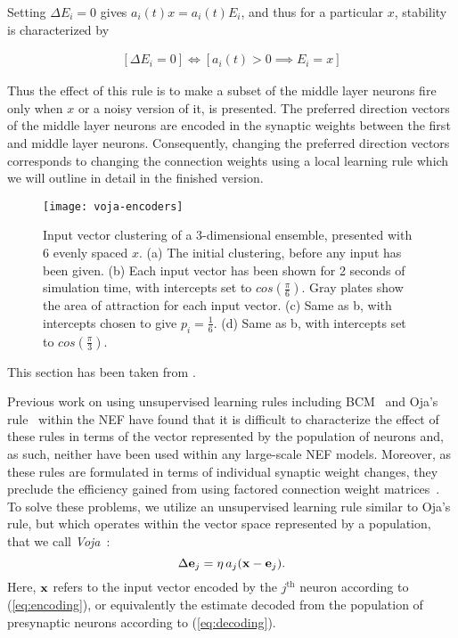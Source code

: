Setting $\Delta{E_i} = 0$ gives $a_i(t)x = a_i(t)E_i$, and thus for a particular $x$, stability is characterized by

\begin{align} \label{stability}
    [\Delta{E_i} = 0]  \iff  [a_i(t) > 0  \implies  E_i = x]
\end{align}

Thus the effect of this rule is to make a subset of the middle layer neurons fire only when $x$ or a noisy version of it, is presented. The preferred direction vectors of the middle layer neurons are encoded in the synaptic weights between the first and middle layer neurons. Consequently, changing the preferred direction vectors corresponds to changing the connection weights using a local learning rule which we will outline in detail in the finished version.

\begin{figure}
    \centering
    \texttt{[image: voja-encoders]}
    \caption{Input vector clustering of a 3-dimensional ensemble, presented with 6 evenly spaced $x$. (a) The initial clustering, before any input has been given. (b) Each input vector has been shown for 2 seconds of simulation time, with intercepts set to $cos(\frac{\pi}{6})$. Gray plates show the area of attraction for each input vector. (c) Same as b, with intercepts chosen to give $p_i = \frac{1}{6}$. (d) Same as b, with intercepts set to $cos(\frac{\pi}{3})$. \label{e3d}}
\end{figure}

This section has been taken from \citep{knight2016}.

Previous work on using unsupervised learning rules including BCM~\citep{bekolay2013} and Oja's rule~\citep{trujillo2014} within the NEF have found that it is difficult to characterize the effect of these rules in terms of the vector represented by the population of neurons and, as such, neither have been used within any large-scale NEF models.
Moreover, as these rules are formulated in terms of individual synaptic weight changes, they preclude the efficiency gained from using factored connection weight matrices~\citep{mundy2015}.
%
To solve these problems, we utilize an unsupervised learning rule similar to Oja's rule, but which operates within the vector space represented by a population, that we call {\it Voja}~\citep{voelker2014a}:
%
\begin{equation}
  \label{eq:voja}
  \Delta \mathbf{e}_j = \eta \, a_j (\mathbf{x} - \mathbf{e}_j) .
\end{equation}
%
Here, $\mathbf{x}$ refers to the input vector encoded by the $j^\mathrm{th}$ neuron according to (\ref{eq:encoding}), or equivalently the estimate decoded from the population of presynaptic neurons  according to (\ref{eq:decoding}).

